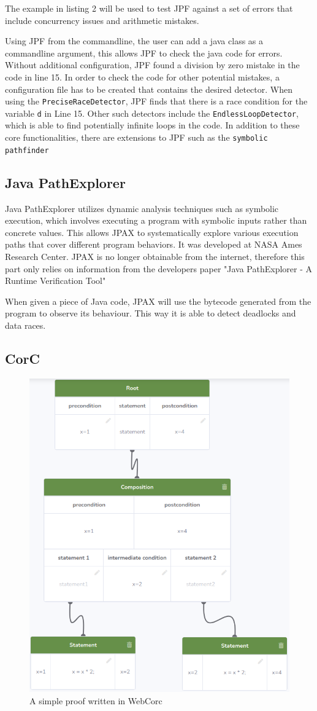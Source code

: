 The example in listing 2 will be used to test JPF against a set of errors that include concurrency issues and arithmetic mistakes. 

Using JPF from the commandline, the user can add a java class as a commandline argument, this allows JPF to check the java code for errors. Without additional configuration, JPF found a division by zero mistake in the code in line 15. In order to check the code for other potential mistakes, a configuration file has to be created that contains the desired detector. When using the \verb|PreciseRaceDetector|, JPF finds that there is a race condition for the variable \verb|d| in Line 15. Other such detectors include the \verb|EndlessLoopDetector|, which is able to find potentially infinite loops in the code. In addition to these core functionalities, there are extensions to JPF such as the \verb|symbolic pathfinder|\citep{jpf-symbc}

\subsection{Java PathExplorer}

Java PathExplorer utilizes dynamic analysis techniques such as symbolic execution, which involves executing a program with symbolic inputs rather than concrete values. This allows JPAX to systematically explore various execution paths that cover different program behaviors. It was developed at NASA Ames Research Center. JPAX is no longer obtainable from the internet, therefore this part only relies on information from the developers paper "Java PathExplorer - A Runtime Verification Tool" \citep{HR1}

When given a piece of Java code, JPAX will use the bytecode generated from the program to observe its behaviour. This way it is able to detect deadlocks and data races. 

\subsection{CorC}
\begin{figure}[h!]
	\centering
	\includegraphics[width=0.5\linewidth]{"Bildschirmfoto von 2023-05-16 15-43-13"}
	\caption{A simple proof written in WebCorc\citep{WebCorC}}
	\label{fig:bildschirmfoto-von-2023-05-16-15-43-13}
\end{figure}

